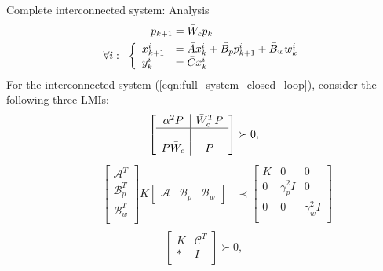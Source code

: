 \begin{frame}{Complete interconnected system: Analysis}
\begin{equation}\label{eqn:full_system_closed_loop}
\begin{split}
&\hspace{0.78cm}p_{k+1}=\bar{W}_cp_k \\
\forall i:
~~&\left\{
\begin{array}{ll}
x^i_{k+1}&=\bar{A}x^i_k+\bar{B}_pp^i_{k+1} + \bar{B}_ww^i_k \\
y^i_k &=\bar{C}x^i_k 
\end{array}
\right.
\end{split}
\end{equation}
For the interconnected system (\ref{eqn:full_system_closed_loop}), consider the following three LMIs:
\begin{equation} \label{eqn_LMI_pos_analysis}
\left[
\begin{array}{c|c}
\alpha^2 P & \bar{W}_c^TP \\
\hline \\
P\bar{W}_c& P
\end{array}\right] \succ 0,
\end{equation} 
\begin{equation} \label{eqn_LMI_Dissipativity}
\begin{split}	
\hspace{1cm}
\begin{bmatrix}
\mathcal{A}^T\\
\mathcal{B}_p^T\\
\mathcal{B}_w^T\\
\end{bmatrix}
K
\begin{bmatrix}
\mathcal{A} & \mathcal{B}_p & \mathcal{B}_w
\end{bmatrix}
&\prec
\begin{bmatrix}
K & 0 & 0\\
0 & \gamma_p^2 I&0\\
0 & 0 &\gamma_w^2 I\\
\end{bmatrix}\\
\end{split}
\end{equation}
\begin{equation}\label{eqn_LMI_output_bound}
\begin{bmatrix}
K & \mathcal{C}^T \\
* & I \\
\end{bmatrix}\succ0, 
\end{equation}
\end{frame}
